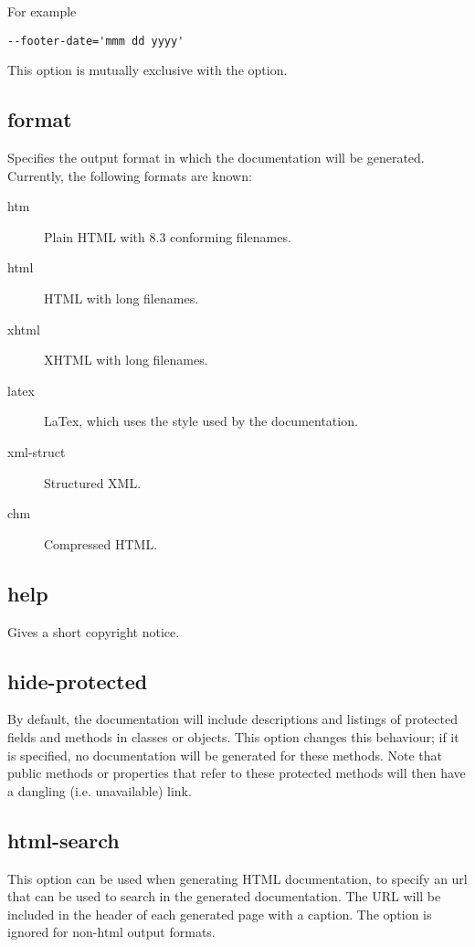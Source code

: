 For example
\begin{verbatim}
--footer-date='mmm dd yyyy'
\end{verbatim}

This option is mutually exclusive with the  option.

\subsection{format}
\label{suse:format}
Specifies the output format in which the documentation will be generated. 
Currently, the following formats are known:
\begin{description}
\item[htm] Plain HTML with 8.3 conforming filenames. 
\item[html] HTML with long filenames.
\item[xhtml] XHTML with long filenames.
\item[latex] LaTex, which uses the  style used by the \fpc
documentation. 
\item[xml-struct] Structured XML.
\item[chm] Compressed HTML.
\end{description}

\subsection{help}
Gives a short copyright notice.

\subsection{hide-protected}
\label{suse:hideprotected}
By default, the documentation will include descriptions and listings of
protected fields and methods in classes or objects. This option changes this
behaviour; if it is specified, no documentation will be generated for these
methods. Note that public methods or properties that refer to these
protected methods will then have a dangling (i.e. unavailable) link.

\subsection{html-search}
\label{suse:htmlsearch}
This option can be used when generating HTML documentation, to specify an
url that can be used to search in the generated documentation. The URL will be
included in the header of each generated page with a  caption.
The option is ignored for non-html output formats.

